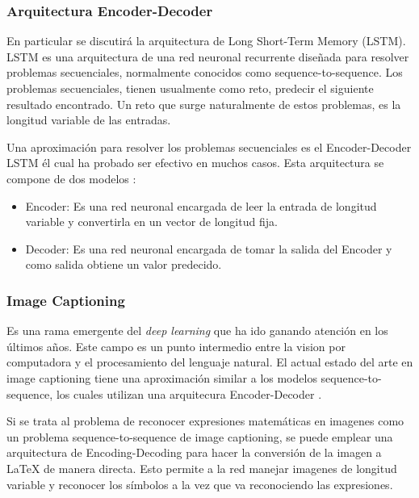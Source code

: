    
  
    \subsubsection{Arquitectura Encoder-Decoder}
    
    En particular se discutirá la arquitectura de Long Short-Term Memory (LSTM). LSTM es una arquitectura de una red neuronal recurrente diseñada para resolver problemas secuenciales, normalmente conocidos como sequence-to-sequence. Los problemas secuenciales, tienen usualmente como reto, predecir el siguiente resultado encontrado. Un reto que surge naturalmente de estos problemas, es la longitud variable de las entradas.
    
    Una aproximación para resolver los problemas secuenciales es el Encoder-Decoder LSTM él cual ha probado ser efectivo en muchos casos. Esta arquitectura se compone de dos modelos \cite{encoderDecoder}:
    
    \begin{itemize}
    	\item Encoder: Es una red neuronal encargada de leer la entrada de longitud variable y convertirla en un vector de longitud fija.
    	\item Decoder: Es una red neuronal encargada de tomar la salida del Encoder y como salida obtiene un valor predecido.
    \end{itemize} 


	\subsubsection{Image Captioning}
    
    Es una rama emergente del \textit{deep learning} que ha ido ganando atención en los últimos años. Este campo es un punto intermedio entre la vision por computadora y el procesamiento del lenguaje natural. El actual estado del arte en image captioning tiene una aproximación similar a los modelos sequence-to-sequence, los cuales utilizan una arquitecura Encoder-Decoder \cite{imagetolatex}.
    
    Si se trata al problema de reconocer expresiones matemáticas en imagenes como un problema sequence-to-sequence de image captioning, se puede emplear una arquitectura de Encoding-Decoding para hacer la conversión de la imagen a LaTeX de manera directa. Esto permite a la red manejar imagenes de longitud variable y reconocer los símbolos a la vez que va reconociendo las expresiones.
    
